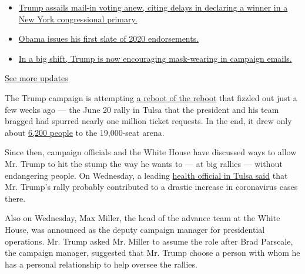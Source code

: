 \begin{itemize}
\tightlist
\item
  \href{https://www.nytimes.com/2020/08/03/us/elections/biden-vs-trump.html?action=click\&pgtype=Article\&state=default\&region=MAIN_CONTENT_1\&context=storylines_live_updates\#link-6494b448}{Trump
  assails mail-in voting anew, citing delays in declaring a winner in a
  New York congressional primary.}
\item
  \href{https://www.nytimes.com/2020/08/03/us/elections/biden-vs-trump.html?action=click\&pgtype=Article\&state=default\&region=MAIN_CONTENT_1\&context=storylines_live_updates\#link-3de249e6}{Obama
  issues his first slate of 2020 endorsements.}
\item
  \href{https://www.nytimes.com/2020/08/03/us/elections/biden-vs-trump.html?action=click\&pgtype=Article\&state=default\&region=MAIN_CONTENT_1\&context=storylines_live_updates\#link-54e34d20}{In
  a big shift, Trump is now encouraging mask-wearing in campaign
  emails.}
\end{itemize}

\href{https://www.nytimes.com/2020/08/03/us/elections/biden-vs-trump.html?action=click\&pgtype=Article\&state=default\&region=MAIN_CONTENT_1\&context=storylines_live_updates}{See
more updates}

The Trump campaign is attempting
\href{https://www.nytimes.com/2020/06/20/us/politics/tulsa-trump-rally.html}{a
reboot of the reboot} that fizzled out just a few weeks ago --- the June
20 rally in Tulsa that the president and his team bragged had spurred
nearly one million ticket requests. In the end, it drew only about
\href{https://www.nytimes.com/2020/06/22/us/politics/trump-rally-coronavirus.html}{6,200
people} to the 19,000-seat arena.

Since then, campaign officials and the White House have discussed ways
to allow Mr. Trump to hit the stump the way he wants to --- at big
rallies --- without endangering people. On Wednesday, a leading
\href{https://apnews.com/ad96548245e186382225818d8dc416eb}{health
official in Tulsa said} that Mr. Trump's rally probably contributed to a
drastic increase in coronavirus cases there.

Also on Wednesday, Max Miller, the head of the advance team at the White
House, was announced as the deputy campaign manager for presidential
operations. Mr. Trump asked Mr. Miller to assume the role after Brad
Parscale, the campaign manager, suggested that Mr. Trump choose a person
with whom he has a personal relationship to help oversee the rallies.

